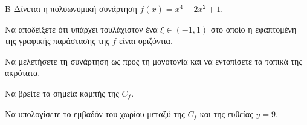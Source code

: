 \begin{thema}{Β}
Δίνεται η πολυωνυμική συνάρτηση $f(x) = x^4 - 2x^2 + 1$.
\begin{erwthma}
\item Να αποδείξετε ότι υπάρχει τουλάχιστον ένα $\xi \in (-1, 1)$ στο οποίο η εφαπτομένη της γραφικής παράστασης της $f$ είναι οριζόντια.
\item Να μελετήσετε τη συνάρτηση ως προς τη μονοτονία και να εντοπίσετε τα τοπικά της ακρότατα.
\item Να βρείτε τα σημεία καμπής της $C_f$.
\item Να υπολογίσετε το εμβαδόν του χωρίου μεταξύ της $C_f$ και της ευθείας $y=9$.
\end{erwthma}
\end{thema}
